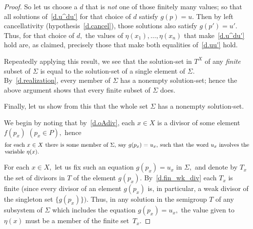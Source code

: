 \documentclass{amsart}
\numberwithin{equation}{section}
\numberwithin{theorem}{section}
\newcommand{\2}{\mathbf{2}}
\begin{document}
\begin{proof}
So let us choose a $d$ that is {\em not} one of those finitely
many values; so that all solutions of~\eqref{d.u^du'}
for that choice of $d$ satisfy $g(p)=u.$
Then by left cancellativity (hypothesis~\eqref{d.cancel}),
those solutions also satisfy $g(p')=u'.$
Thus, for that choice of $d,$ the values of
$\eta(x_1),\dots,\eta(x_n)$ that make~\eqref{d.u^du'} hold are, as
claimed, precisely those that make both equalities of~\eqref{d.uu'}
hold.

Repeatedly applying this result, we see that the solution-set
in $T^X$ of any {\em finite} subset of $\Sigma$ is
equal to the solution-set of a single element of $\Sigma.$
By~\eqref{d.realization}, every member of $\Sigma$
has a nonempty solution-set; hence the above argument
shows that every finite subset of $\Sigma$ does.

Finally, let us show from this that the whole set $\Sigma$
has a nonempty solution-set.

We begin by noting that by~\eqref{d.oAdiv}, each $x\in X$ is
a divisor of some element $f(p_x)$ $(p_x\in P),$ hence
%
\begin{equation}\begin{minipage}[c]{35pc}\label{d.u_x}
for each $x\in X$
there is some member of $\Sigma,$ say $g(p_x) = u_x,$ such that
the word $u_x$ involves the variable $\eta(x).$
\end{minipage}\end{equation}

For each $x\in X,$ let us fix such an equation $g(p_x)=u_x$ in $\Sigma,$
and denote by $T_x$ the set of divisors in $T$ of the element $g(p_x).$
By~\eqref{d.fin_wk_div} each $T_x$ is finite
(since every divisor of an element $g(p_x)$ is, in particular,
a weak divisor of the singleton set $\{g(p_x)\}).$
Thus, in any solution in the semigroup $T$ of any subsystem
of $\Sigma$ which includes the equation $g(p_x) = u_x,$ the
value given to $\eta(x)$ must be a member of the finite set~$T_x.$


\end{proof}
\end{document}

